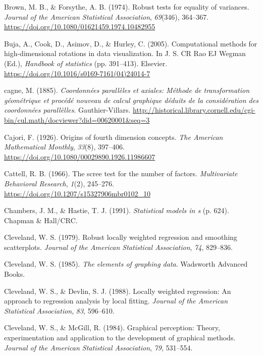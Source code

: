 \documentclass[
  letterpaper,
  10pt,
  krantz2]{krantz}
\newlength{\cslhangindent}
\newenvironment{CSLReferences}[2] %
 {\begin{list}{}{%
  \setlength{\itemindent}{0pt}
  \setlength{\leftmargin}{0pt}
  \setlength{\parsep}{0pt}
  \ifodd #1
   \setlength{\leftmargin}{\cslhangindent}
   \setlength{\itemindent}{-1\cslhangindent}
  \fi
  \setlength{\itemsep}{#2\baselineskip}}}
 {\end{list}}
\begin{document}
\begin{CSLReferences}{1}{0}
Brown, M. B., \& Forsythe, A. B. (1974). Robust tests for equality of
variances. \emph{Journal of the American Statistical Association},
\emph{69}(346), 364--367.
\url{https://doi.org/10.1080/01621459.1974.10482955}

Buja, A., Cook, D., Asimov, D., \& Hurley, C. (2005). Computational
methods for high-dimensional rotations in data visualization. In J. S.
CR Rao EJ Wegman (Ed.), \emph{Handbook of statistics} (pp. 391--413).
Elsevier. \url{https://doi.org/10.1016/s0169-7161(04)24014-7}

cagne, M. (1885). \emph{Coordonn{é}es parall{è}les et axiales: M{é}thode
de transformation g{é}om{é}trique et proc{é}d{é} nouveau de calcul
graphique d{é}duits de la consid{é}ration des coordonn{é}es
parall{è}lles}. Gauthier-Villars.
\url{http://historical.library.cornell.edu/cgi-bin/cul.math/docviewer?did=00620001&seq=3}

Cajori, F. (1926). Origins of fourth dimension concepts. \emph{The
American Mathematical Monthly}, \emph{33}(8), 397--406.
\url{https://doi.org/10.1080/00029890.1926.11986607}

Cattell, R. B. (1966). The scree test for the number of factors.
\emph{Multivariate Behavioral Research}, \emph{1}(2), 245--276.
\url{https://doi.org/10.1207/s15327906mbr0102_10}

Chambers, J. M., \& Hastie, T. J. (1991). \emph{Statistical models in s}
(p. 624). Chapman \& Hall/CRC.

Cleveland, W. S. (1979). Robust locally weighted regression and
smoothing scatterplots. \emph{Journal of the American Statistical
Association}, \emph{74}, 829--836.

Cleveland, W. S. (1985). \emph{The elements of graphing data}. Wadsworth
Advanced Books.

Cleveland, W. S., \& Devlin, S. J. (1988). Locally weighted regression:
An approach to regression analysis by local fitting. \emph{Journal of
the American Statistical Association}, \emph{83}, 596--610.

Cleveland, W. S., \& McGill, R. (1984). Graphical perception: Theory,
experimentation and application to the development of graphical methods.
\emph{Journal of the American Statistical Association}, \emph{79},
531--554.


\end{CSLReferences}
\end{document}
